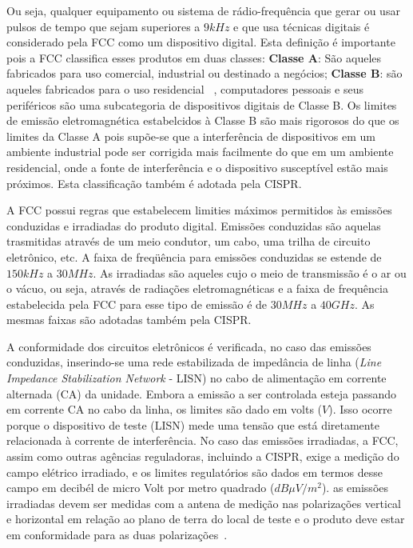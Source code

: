 Ou seja, qualquer equipamento ou sistema de rádio-frequência que gerar ou usar pulsos de tempo que sejam superiores a $9kHz$ e que usa técnicas digitais é considerado pela FCC como um dispositivo digital. Esta definição é importante pois a FCC classifica esses produtos em duas classes: \textbf{Classe A}: São aqueles fabricados para uso comercial, industrial ou destinado a negócios; \textbf{Classe B}: são aqueles fabricados para o uso residencial ~\cite[p.~51]{paul2006}, computadores pessoais e seus periféricos são uma subcategoria de dispositivos digitais de Classe B. Os limites de emissão eletromagnética estabelcidos à Classe B são mais rigorosos do que os limites da Classe A pois supõe-se que a interferência de dispositivos em um ambiente industrial pode ser corrigida mais facilmente do que em um ambiente residencial, onde a fonte de interferência e o dispositivo susceptível estão mais próximos. Esta classificação também é adotada pela CISPR.

A FCC possui regras que estabelecem limities máximos permitidos às emissões conduzidas e irradiadas do produto digital. Emissões conduzidas são aquelas trasmitidas através de um meio condutor, um cabo, uma trilha de circuito eletrônico, etc. A faixa de freqüência para emissões conduzidas se estende de $150 kHz$ a $30 MHz$. As irradiadas são aqueles cujo o meio de transmissão é o ar ou o vácuo, ou seja, através de radiações eletromagnéticas e a faixa de frequência estabelecida pela FCC para esse tipo de emissão é de $30 MHz$ a $40 GHz$. As mesmas faixas são adotadas também pela CISPR.

A conformidade dos circuitos eletrônicos é verificada, no caso das emissões conduzidas, inserindo-se uma rede estabilizada de impedância de linha (\textit{Line Impedance Stabilization Network} - LISN) no cabo de alimentação em corrente alternada (CA) da unidade. Embora a emissão a ser controlada esteja passando em corrente CA no cabo da linha, os limites são dado em volts ($V$). Isso ocorre porque o dispositivo de teste (LISN) mede uma tensão que está diretamente relacionada à corrente de interferência. No caso das emissões irradiadas, a FCC, assim como outras agências reguladoras, incluindo a CISPR, exige a medição do campo elétrico irradiado, e os limites regulatórios são dados em termos desse campo em decibél de micro Volt por metro quadrado ($dB\mu V/m^2$). as emissões irradiadas devem ser medidas com a antena de medição nas polarizações vertical e horizontal em relação ao plano de terra do local de teste e o produto deve estar em conformidade para as duas polarizações~\cite[p.~52]{paul2006}.

